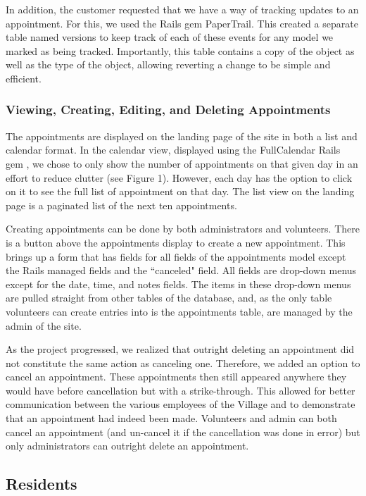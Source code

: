 \documentclass{sig-alternate}
\begin{document}
In addition, the customer requested that we have a way of tracking updates to an appointment. For this, we used the Rails gem PaperTrail. \cite{papertrail} This created a separate table named versions to keep track of each of these events for any model we marked as being tracked. Importantly, this table contains a copy of the object as well as the type of the object, allowing reverting a change to be simple and efficient.

\subsubsection{Viewing, Creating, Editing, and Deleting Appointments}
The appointments are displayed on the landing page of the site in both a list and calendar format. In the calendar view, displayed using the FullCalendar Rails gem \cite{fullcalendar}, we chose to only show the number of appointments on that given day in an effort to reduce clutter (see Figure 1). However, each day has the option to click on it to see the full list of appointment on that day. The list view on the landing page is a paginated list of the next ten appointments.

Creating appointments can be done by both administrators and volunteers. There is a button above the appointments display to create a new appointment. This brings up a form that has fields for all fields of the appointments model except the Rails managed fields and the ``canceled" field. All fields are drop-down menus except for the date, time, and notes fields. The items in these drop-down menus are pulled straight from other tables of the database, and, as the only table volunteers can create entries into is the appointments table, are managed by the admin of the site.

As the project progressed, we realized that outright deleting an appointment did not constitute the same action as canceling one. Therefore, we added an option to cancel an appointment. These appointments then still appeared anywhere they would have before cancellation but with a strike-through. This allowed for better communication between the various employees of the Village and to demonstrate that an appointment had indeed been made. Volunteers and admin can both cancel an appointment (and un-cancel it if the cancellation was done in error) but only administrators can outright delete an appointment.   

\subsection{Residents}
\end{document}
